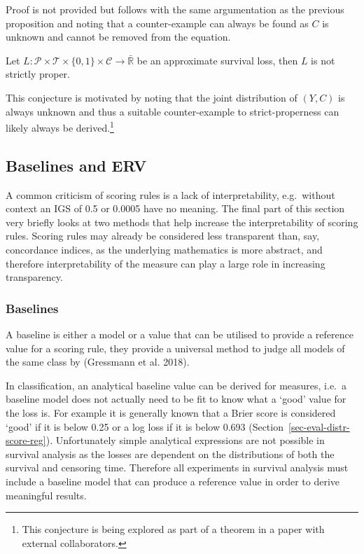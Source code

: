 \documentclass[
  letterpaper,
]{scrbook}
\theoremstyle{plain}
\theoremstyle{definition}
\theoremstyle{remark}
\begin{document}
Proof is not provided but follows with the same argumentation as the
previous proposition and noting that a counter-example can always be
found as \(C\) is unknown and cannot be removed from the equation.

\leavevmode{}%
\label{conj:approx_strictly} Let
\(L: \mathcal{P}\times \mathcal{T}\times \{0,1\}\times \mathcal{C}\rightarrow \bar{\mathbb{R}}\)
be an approximate survival loss, then \(L\) is not strictly proper.

This conjecture is motivated by noting that the joint distribution of
\((Y,C)\) is always unknown and thus a suitable counter-example to
strict-properness can likely always be derived.\footnote{This conjecture
  is being explored as part of a theorem in a paper with external
  collaborators.}

\hypertarget{sec-eval-distr-score-base}{%
\subsection{Baselines and ERV}\label{sec-eval-distr-score-base}}

A common criticism of scoring rules is a lack of interpretability,
e.g.~without context an IGS of 0.5 or 0.0005 have no meaning. The final
part of this section very briefly looks at two methods that help
increase the interpretability of scoring rules. Scoring rules may
already be considered less transparent than, say, concordance indices,
as the underlying mathematics is more abstract, and therefore
interpretability of the measure can play a large role in increasing
transparency.

\hypertarget{sec-eval-distr-score-base-base}{%
\subsubsection{Baselines}\label{sec-eval-distr-score-base-base}}

A baseline is either a model or a value that can be utilised to provide
a reference value for a scoring rule, they provide a universal method to
judge all models of the same class by (Gressmann et al. 2018).

In classification, an analytical baseline value can be derived for
measures, i.e.~a baseline model does not actually need to be fit to know
what a `good' value for the loss is. For example it is generally known
that a Brier score is considered `good' if it is below 0.25 or a log
loss if it is below 0.693 (Section~\ref{sec-eval-distr-score-reg}).
Unfortunately simple analytical expressions are not possible in survival
analysis as the losses are dependent on the distributions of both the
survival and censoring time. Therefore all experiments in survival
analysis must include a baseline model that can produce a reference
value in order to derive meaningful results.
\end{document}
